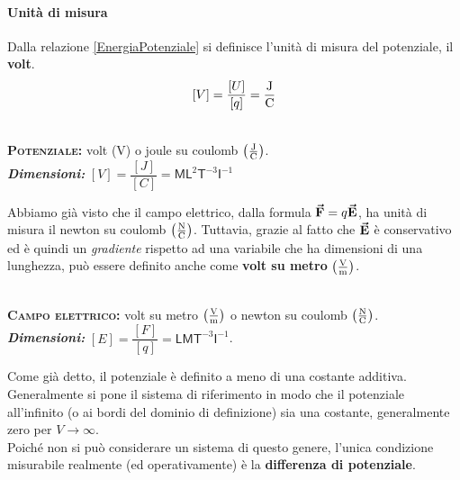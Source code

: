 \paragraph{Unità di misura}
Dalla relazione \ref{EnergiaPotenziale} si definisce l'unità di misura del potenziale, il \textbf{volt}.
\begin{equation*}
	\left[V\right]=\frac{[U]}{[q]}=\unit[per-mode = fraction]{\joule\per\coulomb}
\end{equation*}
\begin{units}~\\
	\textbf{\textsc{Potenziale:}} volt ($\unit{\volt}$) o joule su coulomb $\left(\unit[per-mode = fraction]{\joule\per\coulomb}\right)$.\\
	\textit{\textbf{Dimensioni:}} $[V]=\dfrac{[J]}{[C]}=\mathsf{M} \mathsf{L}^2  \mathsf{T}^{-3}\mathsf{I}^{-1}$
\end{units}
\noindent Abbiamo già visto che il campo elettrico, dalla formula $\vb*{\va{F}}=q\vb*{\va{E}}$, ha unità di misura il newton su coulomb $\left(\unit[per-mode = fraction]{\newton\per\coulomb}\right)$. Tuttavia, grazie al fatto che $\vb*{\va{E}}$ è conservativo ed è quindi un \textit{gradiente} rispetto ad una variabile che ha dimensioni di una lunghezza, può essere definito anche come \textbf{volt su metro} $\left(\unit[per-mode = fraction]{\volt\per\metre}\right)$.
\begin{units}~\\
	\textbf{\textsc{Campo elettrico:}} volt su metro $\left(\unit[per-mode = fraction]{\volt\per\metre}\right)$ o newton su coulomb $\left(\unit[per-mode = fraction]{\newton\per\coulomb}\right)$.\\
	\textit{\textbf{Dimensioni:}} $[E]=\dfrac{[F]}{[q]}=\mathsf{L}\mathsf{M}\mathsf{T}^{-3}\mathsf{I}^{-1}$.
\end{units}
\begin{observe}
	Come già detto, il potenziale è definito a meno di una costante additiva. Generalmente si pone il sistema di riferimento in modo che il potenziale all'infinito (o ai bordi del dominio di definizione) sia una costante, generalmente zero per $V\to\infty$.\\
	Poiché non si può considerare un sistema di questo genere, l'unica condizione misurabile realmente (ed operativamente) è la \textbf{differenza di potenziale}.
\end{observe}
